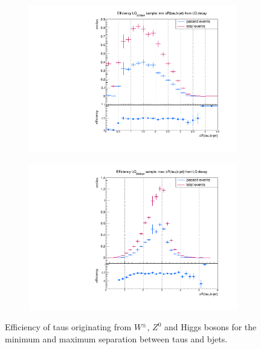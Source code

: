 \begin{figure}
\begin{subfigure}[t]{0.49\textwidth}
                \label{dR:bg:prompt:taubjets:max}
                \end{subfigure}
                \begin{subfigure}[t]{0.49\textwidth}
                \includegraphics[width=\textwidth]{figures/plots/ttH/Divided_mindR_fromH_taubjet.pdf}
                \label{dR:bg:fromH:taubjets:min}
                \end{subfigure}
                \begin{subfigure}[t]{0.49\textwidth}
                \includegraphics[width=\textwidth]{figures/plots/ttH/Divided_maxdR_fromH_taubjet.pdf}
                \label{dR:bg:fromH:taubjets:max}
                \end{subfigure}
\caption[Efficiency of taus originating from $W^\pm$, $Z^0$ and Higgs bosons for the separation between taus and bjets.]{Efficiency of taus originating from $W^\pm$, $Z^0$ and Higgs bosons for the minimum and maximum separation between taus and bjets.}
\label{dR:bg:taubjets}
\end{figure}

